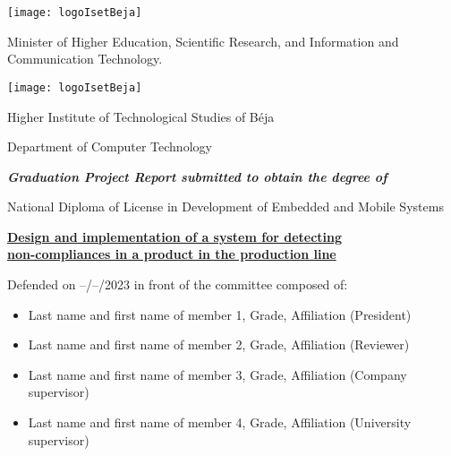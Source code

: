 %
%
\noindent
\begin{minipage}[t]{0.25\linewidth}
  \centering
  \texttt{[image: logoIsetBeja]}
\end{minipage}
\begin{minipage}[t]{0.5\linewidth}
\vspace{-30pt}
Minister of Higher Education, Scientific Research, and Information and Communication Technology.
\end{minipage}
\begin{minipage}[t]{0.25\linewidth}
  \centering
  \texttt{[image: logoIsetBeja]}
\end{minipage}
\begin{center}
Higher Institute of Technological Studies of Béja
\end{center}
\begin{center}
Department of Computer Technology
\end{center}
\vspace{10pt}
\begin{center}
\textbf{\textit{Graduation Project Report submitted to obtain the degree of}}
\end{center}
\begin{center}
National Diploma of License in Development of Embedded and Mobile Systems
\end{center}
\begin{center}

 \huge{\textbf{\underline{Design and implementation of a system for detecting}}} \\
  \huge{\textbf{\underline{non-compliances in a product in the production line}}}\\[10pt]
\end{center}
\vspace{10pt}
\begin{center}
    Defended on --/--/2023 in front of the committee composed of:
\end{center}
\begin{center}
\begin{itemize}
    \item Last name and first name of member 1, Grade, Affiliation (President)
    \item Last name and first name of member 2, Grade, Affiliation (Reviewer)
    \item Last name and first name of member 3, Grade, Affiliation (Company supervisor)
    \item Last name and first name of member 4, Grade, Affiliation (University supervisor)
\end{itemize}
\end{center}
